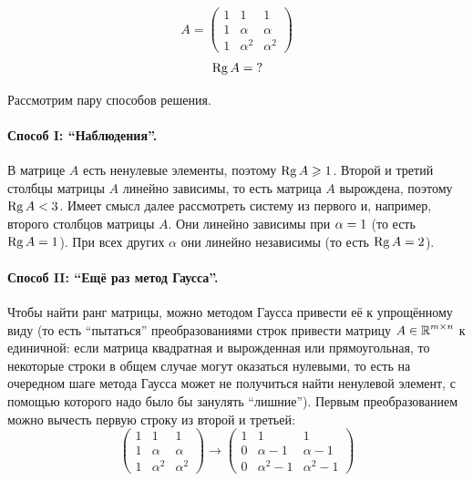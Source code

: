 \documentclass[a4paper,12pt]{article}
\begin{document}
  \[
    A = \begin{pmatrix}
      1 & 1 & 1\\
      1 & \alpha & \alpha\\
      1 & \alpha^2 & \alpha^2
    \end{pmatrix}
  \]
  \[
    \operatorname{Rg} A = \operatorname{?}
  \]
  
  \begin{solution}
  
    Рассмотрим пару способов решения.
    
    \paragraph{Способ I: ``Наблюдения''.}
    
    В матрице $A$ есть ненулевые элементы, поэтому $\Rg A \hm\geq 1$.
    Второй и третий столбцы матрицы $A$ линейно зависимы, то есть матрица $A$ вырождена, поэтому $\Rg A \hm< 3$.
    Имеет смысл далее рассмотреть систему из первого и, например, второго столбцов матрицы $A$.
    Они линейно зависимы при $\alpha \hm= 1$ (то есть $\Rg A \hm= 1$).
    При всех других $\alpha$ они линейно независимы  (то есть $\Rg A \hm= 2$).
  
    \medskip
    
    \paragraph{Способ II: ``Ещё раз метод Гаусса''.}
    
    Чтобы найти ранг матрицы, можно методом Гаусса привести её к упрощённому виду (то есть ``пытаться'' преобразованиями строк привести матрицу $A \hm\in \RR^{m\times n}$ к единичной: если матрица квадратная и вырожденная или прямоугольная, то некоторые строки в общем случае могут оказаться нулевыми, то есть на очередном шаге метода Гаусса может не получиться найти ненулевой элемент, с помощью которого надо было бы занулять ``лишние'').
    Первым преобразованием можно вычесть первую строку из второй и третьей:
    \[
      \begin{pmatrix}
        1 & 1 & 1\\
        1 & \alpha & \alpha\\
        1 & \alpha^2 & \alpha^2
      \end{pmatrix}
      \longrightarrow
      \begin{pmatrix}
      1 & 1 & 1\\
      0 & \alpha - 1 & \alpha - 1\\
      0 & \alpha^2 - 1 & \alpha^2 - 1
    \end{pmatrix}
    \]
    

\end{solution}
\end{document}
